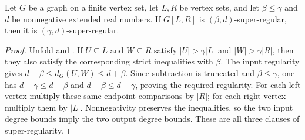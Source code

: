 \begin{lemma}
Let $G$ be a graph on a finite vertex set, let $L,R$ be vertex sets, and let
$\beta\leq\gamma$ and $d$ be nonnegative extended real numbers.
If $G[L,R]$ is $(\beta,d)$-super-regular, then it is
$(\gamma,d)$-super-regular.
\end{lemma}
\begin{proof}
Unfold  and .
If $U\subseteq L$ and $W\subseteq R$ satisfy
$|U|>\gamma|L|$ and $|W|>\gamma|R|$, then they also satisfy the
corresponding strict inequalities with $\beta$. The input regularity gives
$d-\beta\leq d_G(U,W)\leq d+\beta$. Since subtraction is truncated and
$\beta\leq\gamma$, one has $d-\gamma\leq d-\beta$ and
$d+\beta\leq d+\gamma$, proving the required regularity.
For each left vertex multiply these same endpoint comparisons by $|R|$;
for each right vertex multiply them by $|L|$. Nonnegativity preserves the
inequalities, so the two input degree bounds imply the two output degree
bounds. These are all three clauses of super-regularity.
\end{proof}
